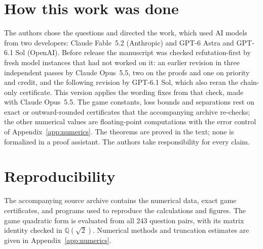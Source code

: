 \section*{How this work was done}
The authors chose the questions and directed the work, which used AI
models from two developers: Claude Fable~5.2 (Anthropic) and GPT-6
Astra and GPT-6.1 Sol (OpenAI). Before release the manuscript was
checked refutation-first by fresh model instances that had not worked
on it: an earlier revision in three independent passes by Claude
Opus~5.5, two on the proofs and one on priority and credit, and the
following revision by GPT-6.1 Sol, which also reran the chain-only
certificate. This version applies the wording fixes from that check,
made with Claude Opus~5.5. The game constants, loss bounds and
separations rest on exact or outward-rounded certificates that the
accompanying archive re-checks; the other numerical values are
floating-point computations with the error control of
Appendix~\ref{app:numerics}. The theorems are proved in the text; none
is formalized in a proof assistant. The authors take responsibility for
every claim.

\section*{Reproducibility}
The accompanying source archive contains the numerical data, exact game certificates, and programs used to reproduce the calculations and figures. The game quadratic form is evaluated from all 243 question pairs, with its matrix identity checked in $\mathbb Q(\sqrt2)$. Numerical methods and truncation estimates are given in Appendix~\ref{app:numerics}.
